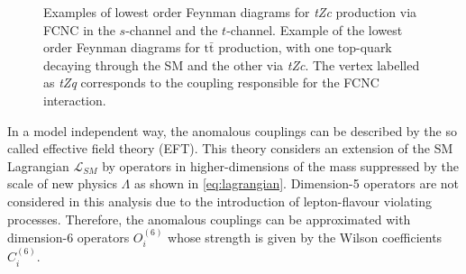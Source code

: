 \begin{figure}[htb]
	\centering
	\qquad
	\caption{Examples of lowest order Feynman diagrams for \textit{tZc} production via FCNC in  the $s$-channel and  the $t$-channel. Example of the lowest order Feynman diagrams for  $\mathrm{t\bar{t}}$ production, with one top-quark decaying through the SM and the other via \textit{tZc}. The vertex labelled as \textit{tZq} corresponds to the coupling responsible for the FCNC interaction.}
	\label{fig:signal}
\end{figure} 

\noindent In a model independent way, the anomalous couplings can be described by the so called effective field theory (EFT).
This theory considers an extension of the SM Lagrangian $\mathcal{L}_{SM}$ by operators in higher-dimensions of the mass suppressed by the scale of new physics $\Lambda$ as shown in \cref{eq:lagrangian}.
Dimension-5 operators are not considered in this analysis due to the introduction of lepton-flavour violating processes. 
Therefore, the anomalous couplings can be approximated with dimension-6 operators $O_{i}^{(6)}$ whose strength  is given by the Wilson coefficients $C_{i}^{(6)}$.\\

